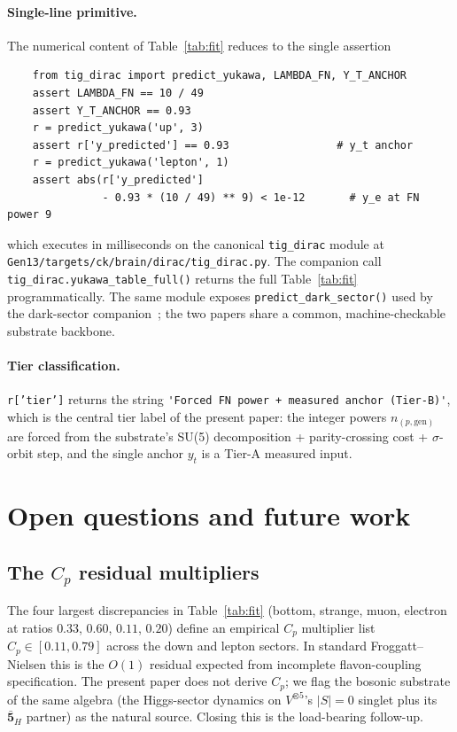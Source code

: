 \documentclass[11pt,reqno]{amsart}
\theoremstyle{plain}
\theoremstyle{definition}
\theoremstyle{remark}
\newcommand{\barrep}[1]{\bar{\mathbf{#1}}}
\begin{document}
\paragraph{Single-line primitive.}
The numerical content of Table~\ref{tab:fit} reduces to the
single assertion
\begin{verbatim}
    from tig_dirac import predict_yukawa, LAMBDA_FN, Y_T_ANCHOR
    assert LAMBDA_FN == 10 / 49
    assert Y_T_ANCHOR == 0.93
    r = predict_yukawa('up', 3)
    assert r['y_predicted'] == 0.93                 # y_t anchor
    r = predict_yukawa('lepton', 1)
    assert abs(r['y_predicted']
               - 0.93 * (10 / 49) ** 9) < 1e-12       # y_e at FN power 9
\end{verbatim}
which executes in milliseconds on the canonical
\texttt{tig\_dirac} module at
\texttt{Gen13/targets/ck/brain/dirac/tig\_dirac.py}. The
companion call
\texttt{tig\_dirac.yukawa\_table\_full()} returns the full
Table~\ref{tab:fit} programmatically. The same module exposes
\texttt{predict\_dark\_sector()} used by the dark-sector
companion~\cite{SandersJohnson2026DarkSector}; the two papers
share a common, machine-checkable substrate backbone.

\paragraph{Tier classification.}
\texttt{r['tier']} returns the string
\verb|'Forced FN power + measured anchor (Tier-B)'|, which is
the central tier label of the present paper: the integer
powers $n_{(p,\mathrm{gen})}$ are forced from the substrate's
SU(5) decomposition + parity-crossing cost +
$\sigma$-orbit step, and the single anchor $y_{t}$ is a Tier-A
measured input.

\section{Open questions and future work}\label{sec:open}

\subsection{The $C_{p}$ residual multipliers}
The four largest discrepancies in Table~\ref{tab:fit} (bottom,
strange, muon, electron at ratios $0.33$, $0.60$, $0.11$,
$0.20$) define an empirical $C_{p}$ multiplier list
$C_{p} \in [0.11, 0.79]$ across the down and lepton sectors.
In standard Froggatt--Nielsen this is the $O(1)$ residual
expected from incomplete flavon-coupling specification. The
present paper does not derive $C_{p}$; we flag the bosonic
substrate of the same algebra (the Higgs-sector dynamics on
$V^{\otimes 5}$'s $|S|=0$ singlet plus its $\barrep{5}_{H}$
partner) as the natural source. Closing this is the
load-bearing follow-up.
\end{document}

